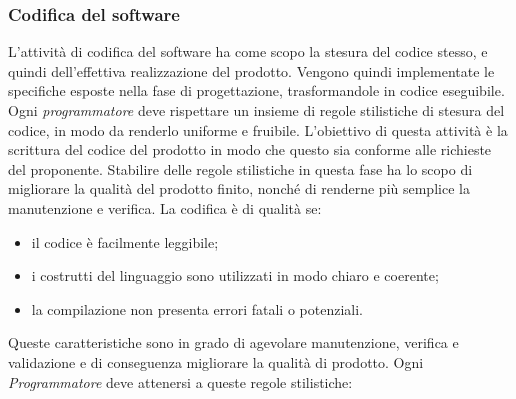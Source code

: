 \subsubsection{Codifica del software}
L'attività di codifica del software ha come scopo la stesura del codice stesso, e quindi dell'effettiva realizzazione del prodotto.
Vengono quindi implementate le specifiche esposte nella fase di progettazione, trasformandole in codice eseguibile.
Ogni \textit{programmatore} deve rispettare un insieme di regole stilistiche di stesura del codice, in modo da renderlo uniforme e fruibile.
L'obiettivo di questa attività è la scrittura del codice del prodotto in modo che questo sia conforme alle richieste del proponente.
Stabilire delle regole stilistiche in questa fase ha lo scopo di migliorare la qualità del prodotto finito, nonché di renderne più semplice la manutenzione e verifica.
La codifica è di qualità se:
\begin{itemize}
    \item il codice è facilmente leggibile;
    \item i costrutti del linguaggio sono utilizzati in modo chiaro e coerente;
    \item la compilazione non presenta errori fatali o potenziali.
\end{itemize}
Queste caratteristiche sono in grado di agevolare manutenzione, verifica e validazione e di conseguenza migliorare
la qualità di prodotto.
Ogni \textit{Programmatore} deve attenersi a queste regole stilistiche:
